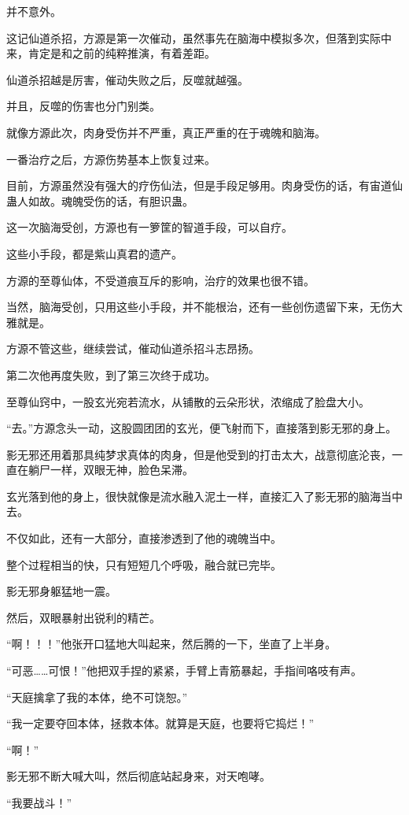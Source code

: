 \begin{this_body}
并不意外。

这记仙道杀招，方源是第一次催动，虽然事先在脑海中模拟多次，但落到实际中来，肯定是和之前的纯粹推演，有着差距。

仙道杀招越是厉害，催动失败之后，反噬就越强。

并且，反噬的伤害也分门别类。

就像方源此次，肉身受伤并不严重，真正严重的在于魂魄和脑海。

一番治疗之后，方源伤势基本上恢复过来。

目前，方源虽然没有强大的疗伤仙法，但是手段足够用。肉身受伤的话，有宙道仙蛊人如故。魂魄受伤的话，有胆识蛊。

这一次脑海受创，方源也有一箩筐的智道手段，可以自疗。

这些小手段，都是紫山真君的遗产。

方源的至尊仙体，不受道痕互斥的影响，治疗的效果也很不错。

当然，脑海受创，只用这些小手段，并不能根治，还有一些创伤遗留下来，无伤大雅就是。

方源不管这些，继续尝试，催动仙道杀招斗志昂扬。

第二次他再度失败，到了第三次终于成功。

至尊仙窍中，一股玄光宛若流水，从铺散的云朵形状，浓缩成了脸盘大小。

“去。”方源念头一动，这股圆团团的玄光，便飞射而下，直接落到影无邪的身上。

影无邪还用着那具纯梦求真体的肉身，但是他受到的打击太大，战意彻底沦丧，一直在躺尸一样，双眼无神，脸色呆滞。

玄光落到他的身上，很快就像是流水融入泥土一样，直接汇入了影无邪的脑海当中去。

不仅如此，还有一大部分，直接渗透到了他的魂魄当中。

整个过程相当的快，只有短短几个呼吸，融合就已完毕。

影无邪身躯猛地一震。

然后，双眼暴射出锐利的精芒。

“啊！！！”他张开口猛地大叫起来，然后腾的一下，坐直了上半身。

“可恶……可恨！”他把双手捏的紧紧，手臂上青筋暴起，手指间咯吱有声。

“天庭擒拿了我的本体，绝不可饶恕。”

“我一定要夺回本体，拯救本体。就算是天庭，也要将它捣烂！”

“啊！”

影无邪不断大喊大叫，然后彻底站起身来，对天咆哮。

“我要战斗！”


\end{this_body}
